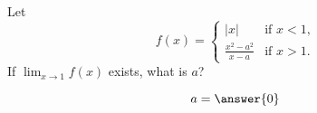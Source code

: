 \documentclass[handout]{ximera}
\begin{document}
\begin{exercise}
Let
\[
f(x) = \begin{cases}
  |x| &\text{if $x<1$,} \\
  \frac{x^2-a^2}{x-a} &\text{if $x>1$.}
\end{cases}
\]
If $\displaystyle\lim_{x \to 1} f(x)$ exists, what is $a$?

  \[
a = \answer{0}
\]

\end{exercise}
\end{document}
